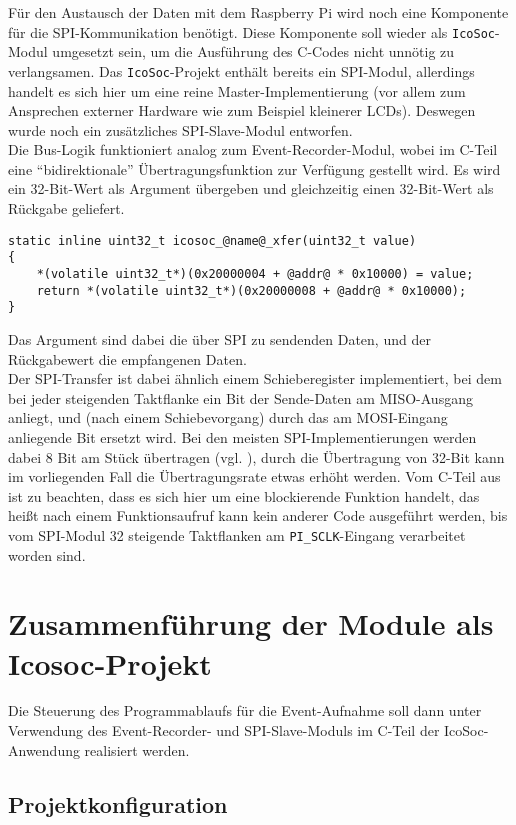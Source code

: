 {Für den Austausch der Daten mit dem Raspberry Pi wird noch eine Komponente für die SPI-Kommunikation benötigt. Diese Komponente soll wieder als {\tt IcoSoc}-Modul umgesetzt sein, um die Ausführung des C-Codes nicht unnötig zu verlangsamen. Das {\tt IcoSoc}-Projekt enthält bereits ein SPI-Modul, allerdings handelt es sich hier um eine reine Master-Implementierung (vor allem zum Ansprechen externer Hardware wie zum Beispiel kleinerer LCDs). 
Deswegen wurde noch ein zusätzliches SPI-Slave-Modul entworfen.\\
Die Bus-Logik funktioniert analog zum Event-Recorder-Modul, wobei im C-Teil eine ``bidirektionale'' Übertragungsfunktion zur Verfügung gestellt wird. Es wird ein 32-Bit-Wert als Argument übergeben und gleichzeitig einen 32-Bit-Wert als Rückgabe geliefert. 
\begin{verbatim}
static inline uint32_t icosoc_@name@_xfer(uint32_t value)  
{
    *(volatile uint32_t*)(0x20000004 + @addr@ * 0x10000) = value;
    return *(volatile uint32_t*)(0x20000008 + @addr@ * 0x10000);
}
\end{verbatim}
Das Argument sind dabei die über SPI zu sendenden Daten, und der Rückgabewert die empfangenen Daten.\\
Der SPI-Transfer ist dabei ähnlich einem Schieberegister implementiert, bei dem bei jeder steigenden Taktflanke ein Bit der Sende-Daten am MISO-Ausgang anliegt, und (nach einem Schiebevorgang) durch das am MOSI-Eingang anliegende Bit ersetzt wird.
Bei den meisten SPI-Implementierungen  werden dabei 8 Bit am Stück übertragen (vgl. \cite{wiki:SPI}), durch die Übertragung von 32-Bit kann im vorliegenden Fall die Übertragungsrate etwas erhöht werden. 
Vom C-Teil aus ist zu beachten, dass es sich hier um eine blockierende Funktion handelt, das heißt nach einem Funktionsaufruf kann kein anderer Code ausgeführt werden, bis vom SPI-Modul 32 steigende Taktflanken am {\tt PI\_SCLK}-Eingang verarbeitet worden sind.
\section{Zusammenführung der Module als Icosoc-Projekt}
\label{ch:Implementierung:sec:Icosoc-Projekt}

Die Steuerung des Programmablaufs für die Event-Aufnahme soll dann unter Verwendung des Event-Recorder- und SPI-Slave-Moduls im C-Teil der IcoSoc-Anwendung realisiert werden.\\

\subsection{Projektkonfiguration}

}
